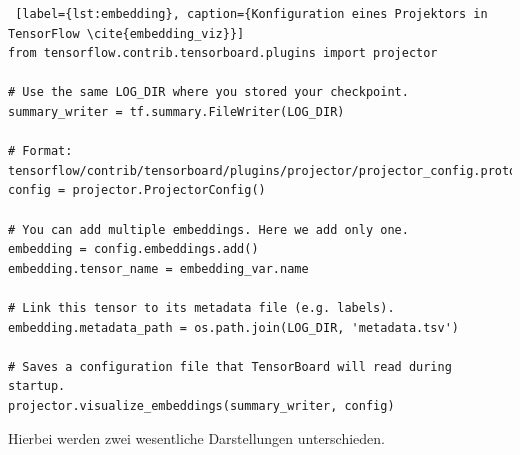 \begin{minipage}{\linewidth}
\begin{lstlisting} [label={lst:embedding}, caption={Konfiguration eines Projektors in TensorFlow \cite{embedding_viz}}]
from tensorflow.contrib.tensorboard.plugins import projector

# Use the same LOG_DIR where you stored your checkpoint.
summary_writer = tf.summary.FileWriter(LOG_DIR)

# Format: tensorflow/contrib/tensorboard/plugins/projector/projector_config.proto
config = projector.ProjectorConfig()

# You can add multiple embeddings. Here we add only one.
embedding = config.embeddings.add()
embedding.tensor_name = embedding_var.name

# Link this tensor to its metadata file (e.g. labels).
embedding.metadata_path = os.path.join(LOG_DIR, 'metadata.tsv')

# Saves a configuration file that TensorBoard will read during startup.
projector.visualize_embeddings(summary_writer, config)
\end{lstlisting}
\end{minipage}
\vspace{0.3cm}

Hierbei werden zwei wesentliche Darstellungen unterschieden.
\vspace{10pt}

